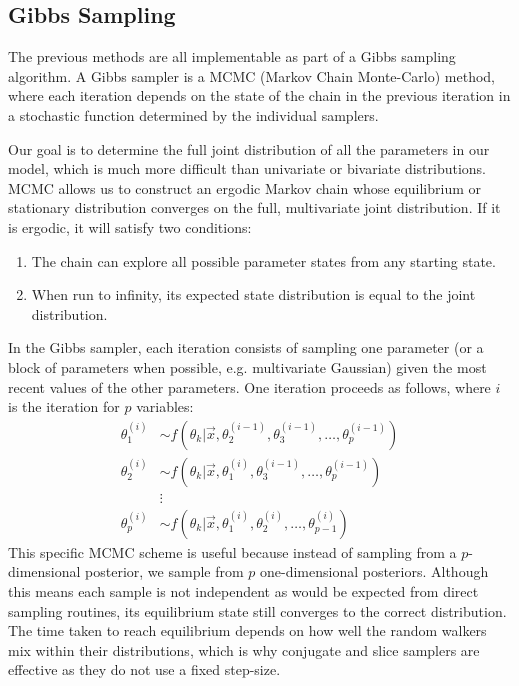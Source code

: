 \documentclass[a4paper, 12pt]{article}
\begin{document}
\subsection{Gibbs Sampling}
The previous methods are all implementable as part of a Gibbs sampling algorithm. A Gibbs sampler is a MCMC (Markov Chain Monte-Carlo) method, where each iteration depends on the state of the chain in the previous iteration in a stochastic function determined by the individual samplers.

Our goal is to determine the full joint distribution of all the parameters in our model, which is much more difficult than univariate or bivariate distributions. MCMC allows us to construct an ergodic Markov chain whose equilibrium or stationary distribution converges on the full, multivariate joint distribution. If it is ergodic, it will satisfy two conditions:

\begin{enumerate}
\item The chain can explore all possible parameter states from any starting state.
\item When run to infinity, its expected state distribution is equal to the joint distribution.
\end{enumerate}

In the Gibbs sampler, each iteration consists of sampling one parameter (or a block of parameters when possible, e.g. multivariate Gaussian) given the most recent values of the other parameters. One iteration proceeds as follows, where $i$ is the iteration for $p$ variables:
\begin{align}
\theta_1^{(i)} &\sim f\left( \theta_k|\vec{x}, \theta_2^{(i-1)}, \theta_3^{(i-1)},\dots, \theta_p^{(i-1)} \right)\\
\theta_2^{(i)} &\sim f\left( \theta_k|\vec{x}, \theta_1^{(i)}, \theta_3^{(i-1)},\dots, \theta_p^{(i-1)} \right)\\
&\vdots\nonumber\\
\theta_p^{(i)} &\sim f\left( \theta_k|\vec{x}, \theta_1^{(i)}, \theta_2^{(i)},\dots, \theta_{p-1}^{(i)} \right)
\end{align}
This specific MCMC scheme is useful because instead of sampling from a $p$-dimensional posterior, we sample from $p$ one-dimensional posteriors. Although this means each sample is not independent as would be expected from direct sampling routines, its equilibrium state still converges to the correct distribution. The time taken to reach equilibrium depends on how well the random walkers mix within their distributions, which is why conjugate and slice samplers are effective as they do not use a fixed step-size.
\end{document}
